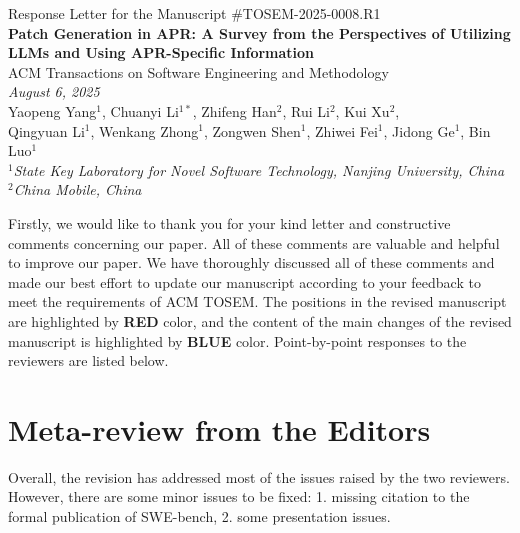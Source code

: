 \documentclass[acmsmall]{acmart}
\begin{document}
	\pagestyle{plain}
	\begin{center}
		\Large Response Letter for the Manuscript \#TOSEM-2025-0008.R1 \\[1.5em]

		\LARGE\textbf{Patch Generation in APR: A Survey from the Perspectives of Utilizing LLMs and Using
		APR-Specific Information} \\[1.5em]

		\large ACM Transactions on Software Engineering and Methodology \\[1em]

		\normalsize \textit{August 6, 2025} \\[1.5em]

		\normalsize Yaopeng Yang$^{1}$, Chuanyi Li$^{1\ast}$, Zhifeng Han$^{2}$, Rui Li$^{2}$, Kui
		Xu$^{2}$, \\ Qingyuan Li$^{1}$, Wenkang Zhong$^{1}$, Zongwen Shen$^{1}$, Zhiwei Fei$^{1}$,
		Jidong Ge$^{1}$, Bin Luo$^{1}$ \\[1em]

		$^{1}$\textit{State Key Laboratory for Novel Software Technology, Nanjing University, China}
		\\

		$^{2}$\textit{China Mobile, China} \\[10em]
	\end{center}

	\renewcommand{\shortauthors}{YaoPeng Yang, et al.}
	\newcommand{\SectionPosition}[1]{\textbf{$\triangleright$ #1}}

	Firstly, we would like to thank you for your kind letter and constructive comments concerning
	our paper. All of these comments are valuable and helpful to improve our paper. We have
	thoroughly discussed all of these comments and made our best effort to update our manuscript
	according to your feedback to meet the requirements of ACM TOSEM. The positions in the revised manuscript
	are highlighted by {\color{red} \textbf{RED}} color, and the content of the main changes of the
	revised manuscript is highlighted by {\color{blue} \textbf{BLUE}} color. Point-by-point responses
	to the reviewers are listed below.

	\section*{Meta-review from the Editors}
	\begin{tcolorbox}
		[commentbox,title=Reviewer \#0 - Comment 1] Overall, the revision has addressed most of the issues
		raised by the two reviewers. However, there are some minor issues to be fixed: 1. missing
		citation to the formal publication of SWE-bench, 2. some presentation issues.
	\end{tcolorbox}
\end{document}

